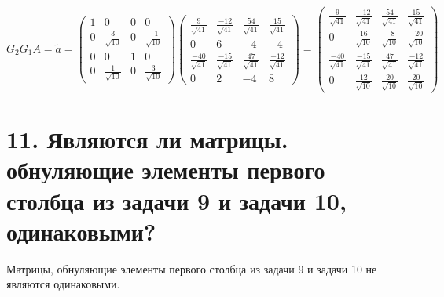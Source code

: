 \documentclass[a4paper,14pt]{article}
\begin{document}
$$
G_2G_1A = \tilde{a} = \begin{pmatrix}
    1  & 0                   & 0 & 0                    \\
    0  & \frac{3}{\sqrt{10}} & 0 & \frac{-1}{\sqrt{10}} \\
    0  & 0                   & 1 & 0                    \\
    0  & \frac{1}{\sqrt{10}} & 0 & \frac{3}{\sqrt{10}}
                    \end{pmatrix}
                    \begin{pmatrix}
    \frac{9}{\sqrt{41}}    & \frac{-12}{\sqrt{41}} & \frac{54}{\sqrt{41}} & \frac{15}{\sqrt{41}}  \\   
    0                      & 6                     & -4                   & -4                    \\
    \frac{-40}{\sqrt{41}}  & \frac{-15}{\sqrt{41}} & \frac{47}{\sqrt{41}} & \frac{-12}{\sqrt{41}} \\
    0                      & 2                     & -4                   & 8 
                    \end{pmatrix}
                    =
                    \begin{pmatrix}
    \frac{9}{\sqrt{41}}    & \frac{-12}{\sqrt{41}} & \frac{54}{\sqrt{41}} & \frac{15}{\sqrt{41}}  \\   
    0                      & \frac{16}{\sqrt{10}}  & \frac{-8}{\sqrt{10}} & \frac{-20}{\sqrt{10}} \\
    \frac{-40}{\sqrt{41}}  & \frac{-15}{\sqrt{41}} & \frac{47}{\sqrt{41}} & \frac{-12}{\sqrt{41}} \\
    0                      & \frac{12}{\sqrt{10}}  & \frac{20}{\sqrt{10}} & \frac{20}{\sqrt{10}}
                    \end{pmatrix}
$$



\section{11. Являются ли матрицы. обнуляющие элементы первого столбца из задачи 9 и задачи 10, одинаковыми?}

Матрицы, обнуляющие элементы первого столбца из задачи 9 и задачи 10 не являются одинаковыми.
\end{document}
